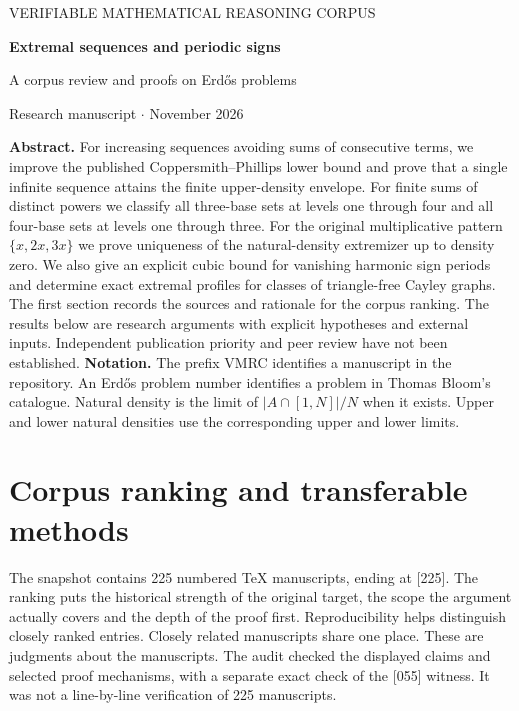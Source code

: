 \documentclass[11pt]{article}
\begin{document}
\begin{center}
{\sffamily\small\color{accent} VERIFIABLE MATHEMATICAL REASONING CORPUS}\par\medskip
{\LARGE\bfseries\color{ink} Extremal sequences and periodic signs}\par
{\Large A corpus review and proofs on Erd\H{o}s problems}\par\medskip
{\small Research manuscript \enspace $\cdot$  November 2026}
\end{center}
\textbf{Abstract.}
For increasing sequences avoiding sums of consecutive terms, we improve the published Coppersmith--Phillips lower bound and prove that a single infinite sequence attains the finite upper-density envelope. For finite sums of distinct powers we classify all three-base sets at levels one through four and all four-base sets at levels one through three. For the original multiplicative pattern $\{x,2x,3x\}$ we prove uniqueness of the natural-density extremizer up to density zero. We also give an explicit cubic bound for vanishing harmonic sign periods and determine exact extremal profiles for classes of triangle-free Cayley graphs. The first section records the sources and rationale for the corpus ranking. The results below are research arguments with explicit hypotheses and external inputs. Independent publication priority and peer review have not been established.
\tableofcontents
\bigskip
\textbf{Notation.} The prefix VMRC identifies a manuscript in the repository. An Erd\H{o}s problem number identifies a problem in Thomas Bloom's catalogue. Natural density is the limit of $|A\cap[1,N]|/N$ when it exists. Upper and lower natural densities use the corresponding upper and lower limits.
\clearpage
\section{Corpus ranking and transferable methods}
The snapshot contains 225 numbered TeX manuscripts, ending at [225]. The ranking puts the historical strength of the original target, the scope the argument actually covers and the depth of the proof first. Reproducibility helps distinguish closely ranked entries. Closely related manuscripts share one place. These are judgments about the manuscripts. The audit checked the displayed claims and selected proof mechanisms, with a separate exact check of the [055] witness. It was not a line-by-line verification of 225 manuscripts.
\par\smallskip
\end{document}
